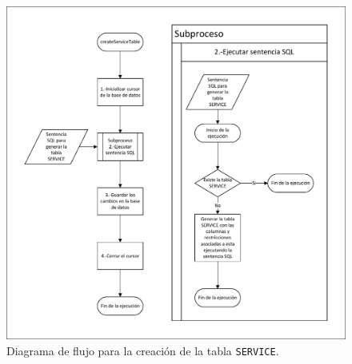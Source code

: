 \begin{figure}[H]
\centering
\includegraphics[width=.9\textwidth]{fig/Diagramas de flujo/createServiceTable.pdf}
\caption{Diagrama de flujo para la creación de la tabla \texttt{SERVICE}.}
\label{fig:DiagramaFlujoCreateServiceTable}
\end{figure}

